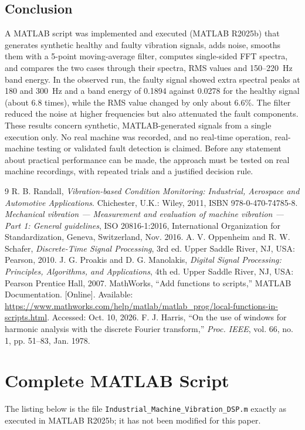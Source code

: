 \documentclass[10pt,twocolumn,a4paper]{article}
\begin{document}
\subsection{Conclusion}
A MATLAB script was implemented and executed (MATLAB R2025b) that generates synthetic healthy and faulty vibration signals, adds noise, smooths them with a
5-point moving-average filter, computes single-sided FFT spectra, and compares the two cases through their spectra, RMS values and
150--220~Hz band energy. In the observed run, the faulty signal showed extra spectral peaks at 180 and 300~Hz and a band energy of 0.1894 against 0.0278 for the healthy signal (about 6.8 times),
while the RMS value changed by only about 6.6\%. The filter reduced the noise at higher frequencies but also attenuated the fault components. These results concern synthetic, MATLAB-generated signals from a single execution only.
No real machine was recorded, and no real-time operation, real-machine testing or validated fault detection is claimed. Before any statement about practical performance can be made, the
approach must be tested on real machine recordings, with repeated trials and a justified decision rule.

\begin{thebibliography}{9}
 R. B. Randall, \emph{Vibration-based Condition Monitoring: Industrial, Aerospace and Automotive Applications}. Chichester, U.K.: Wiley, 2011, ISBN 978-0-470-74785-8.
 \emph{Mechanical vibration --- Measurement and evaluation of machine vibration --- Part 1: General guidelines}, ISO 20816-1:2016, International Organization for Standardization, Geneva, Switzerland, Nov. 2016.
 A. V. Oppenheim and R. W. Schafer, \emph{Discrete-Time Signal Processing}, 3rd ed. Upper Saddle River, NJ, USA: Pearson, 2010.
 J. G. Proakis and D. G. Manolakis, \emph{Digital Signal Processing: Principles, Algorithms, and Applications}, 4th ed. Upper Saddle River, NJ, USA: Pearson Prentice Hall, 2007.
 MathWorks, ``Add functions to scripts,'' MATLAB Documentation. [Online]. Available: \url{https://www.mathworks.com/help/matlab/matlab_prog/local-functions-in-scripts.html}. Accessed: Oct. 10, 2026.
 F. J. Harris, ``On the use of windows for harmonic analysis with the discrete Fourier transform,'' \emph{Proc. IEEE}, vol. 66, no. 1, pp. 51--83, Jan. 1978.
\end{thebibliography}

\onecolumn
\appendix
\section{Complete MATLAB Script}\label{app:code}
The listing below is the file \texttt{Industrial\_Machine\_Vibration\_DSP.m} exactly as executed in MATLAB R2025b; it has not been modified for this paper.


\end{document}
